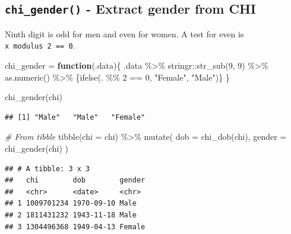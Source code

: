 \documentclass[
]{book}
\newenvironment{Shaded}{\begin{snugshade}}{\end{snugshade}}
\newcommand{\AttributeTok}[1]{\textcolor[rgb]{0.77,0.63,0.00}{#1}}
\newcommand{\CommentTok}[1]{\textcolor[rgb]{0.56,0.35,0.01}{\textit{#1}}}
\newcommand{\ControlFlowTok}[1]{\textcolor[rgb]{0.13,0.29,0.53}{\textbf{#1}}}
\newcommand{\DecValTok}[1]{\textcolor[rgb]{0.00,0.00,0.81}{#1}}
\newcommand{\FunctionTok}[1]{\textcolor[rgb]{0.00,0.00,0.00}{#1}}
\newcommand{\NormalTok}[1]{#1}
\newcommand{\OtherTok}[1]{\textcolor[rgb]{0.56,0.35,0.01}{#1}}
\newcommand{\SpecialCharTok}[1]{\textcolor[rgb]{0.00,0.00,0.00}{#1}}
\newcommand{\StringTok}[1]{\textcolor[rgb]{0.31,0.60,0.02}{#1}}
\begin{document}
\hypertarget{chi_gender---extract-gender-from-chi}{%
\subsection{\texorpdfstring{\texttt{chi\_gender()} - Extract gender from CHI}{chi\_gender() - Extract gender from CHI}}\label{chi_gender---extract-gender-from-chi}}

Ninth digit is odd for men and even for women.
A test for even is \texttt{x\ modulus\ 2\ ==\ 0}.

\begin{Shaded}
\begin{Highlighting}[]
\NormalTok{chi\_gender }\OtherTok{=} \ControlFlowTok{function}\NormalTok{(.data)\{}
\NormalTok{  .data }\SpecialCharTok{\%\textgreater{}\%} 
\NormalTok{    stringr}\SpecialCharTok{::}\FunctionTok{str\_sub}\NormalTok{(}\DecValTok{9}\NormalTok{, }\DecValTok{9}\NormalTok{) }\SpecialCharTok{\%\textgreater{}\%} 
    \FunctionTok{as.numeric}\NormalTok{() }\SpecialCharTok{\%\textgreater{}\%} 
\NormalTok{    \{}\FunctionTok{ifelse}\NormalTok{(. }\SpecialCharTok{\%\%} \DecValTok{2} \SpecialCharTok{==} \DecValTok{0}\NormalTok{, }\StringTok{"Female"}\NormalTok{, }\StringTok{"Male"}\NormalTok{)\}}
\NormalTok{\}}

\FunctionTok{chi\_gender}\NormalTok{(chi)}
\end{Highlighting}
\end{Shaded}

\begin{verbatim}
## [1] "Male"   "Male"   "Female"
\end{verbatim}

\begin{Shaded}
\begin{Highlighting}[]
\CommentTok{\# From tibble}
\FunctionTok{tibble}\NormalTok{(}\AttributeTok{chi =}\NormalTok{ chi) }\SpecialCharTok{\%\textgreater{}\%} 
  \FunctionTok{mutate}\NormalTok{(}
    \AttributeTok{dob =} \FunctionTok{chi\_dob}\NormalTok{(chi),}
    \AttributeTok{gender =} \FunctionTok{chi\_gender}\NormalTok{(chi)}
\NormalTok{  )}
\end{Highlighting}
\end{Shaded}

\begin{verbatim}
## # A tibble: 3 x 3
##   chi        dob        gender
##   <chr>      <date>     <chr> 
## 1 1009701234 1970-09-10 Male  
## 2 1811431232 1943-11-18 Male  
## 3 1304496368 1949-04-13 Female
\end{verbatim}
\end{document}
